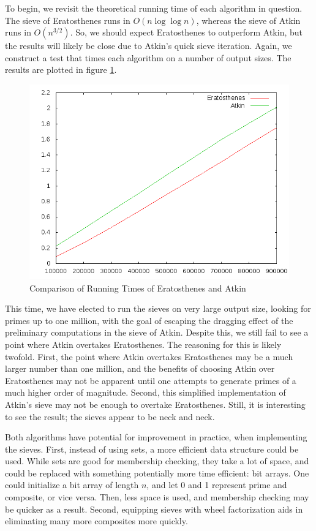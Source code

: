 \documentclass{amsart}
\theoremstyle{definition}
\theoremstyle{case}
\begin{document}
	To begin, we revisit the theoretical running time of each algorithm in question. The sieve of Eratosthenes runs in $O(n \log \log n)$, whereas the sieve of Atkin runs in $O(n^{3/2})$. So, we should expect Eratosthenes to outperform Atkin, but the results will likely be close due to Atkin's quick sieve iteration. Again, we construct a test that times each algorithm on a number of output sizes. The results are plotted in figure \ref{runtimeeratkin}.
	
	\begin{figure}\caption{Comparison of Running Times of Eratosthenes and Atkin}
		\label{runtimeeratkin}
		\includegraphics[scale=0.5]{eratkin1.png}
	\end{figure}

	This time, we have elected to run the sieves on very large output size, looking for primes up to one million, with the goal of escaping the dragging effect of the preliminary computations in the sieve of Atkin. Despite this, we still fail to see a point where Atkin overtakes Eratosthenes. The reasoning for this is likely twofold. First, the point where Atkin overtakes Eratosthenes may be a much larger number than one million, and the benefits of choosing Atkin over Eratosthenes may not be apparent until one attempts to generate primes of a much higher order of magnitude. Second, this simplified implementation of Atkin's sieve may not be enough to overtake Eratosthenes. Still, it is interesting to see the result; the sieves appear to be neck and neck.
	
	Both algorithms have potential for improvement in practice, when implementing the sieves. First, instead of using sets, a more efficient data structure could be used. While sets are good for membership checking, they take a lot of space, and could be replaced with something potentially more time efficient: bit arrays. One could initialize a bit array of length $n$, and let 0 and 1 represent prime and composite, or vice versa. Then, less space is used, and membership checking may be quicker as a result. Second, equipping sieves with wheel factorization aids in eliminating many more composites more quickly.
	
\end{document}
